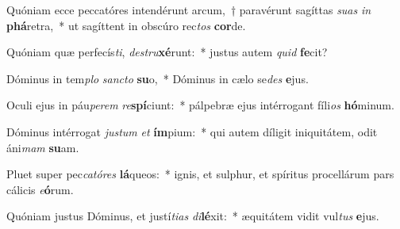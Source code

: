 \item Quóniam ecce peccatóres intendérunt arcum,~† paravérunt sagíttas \textit{su}\textit{as} \textit{in} \textbf{phá}retra,~* ut sagíttent in obscúro rec\textit{tos} \textbf{cor}de.
\item Quóniam quæ perfecís\textit{ti}, \textit{de}\textit{stru}\textbf{xé}runt:~* justus autem \textit{quid} \textbf{fe}cit?
\item Dóminus in tem\textit{plo} \textit{sanc}\textit{to} \textbf{su}o,~* Dóminus in cælo se\textit{des} \textbf{e}jus.
\item Oculi ejus in páu\textit{pe}\textit{rem} \textit{re}\textbf{spí}ciunt:~* pálpebræ ejus intérrogant fíli\textit{os} \textbf{hó}minum.
\item Dóminus intérrogat \textit{jus}\textit{tum} \textit{et} \textbf{ím}pium:~* qui autem díligit iniquitátem, odit áni\textit{mam} \textbf{su}am.
\item Pluet super pec\textit{ca}\textit{tó}\textit{res} \textbf{lá}queos:~* ignis, et sulphur, et spíritus procellárum pars cálicis \textit{e}\textbf{ó}rum.
\item Quóniam justus Dóminus, et justí\textit{ti}\textit{as} \textit{di}\textbf{lé}xit:~* æquitátem vidit vul\textit{tus} \textbf{e}jus.
